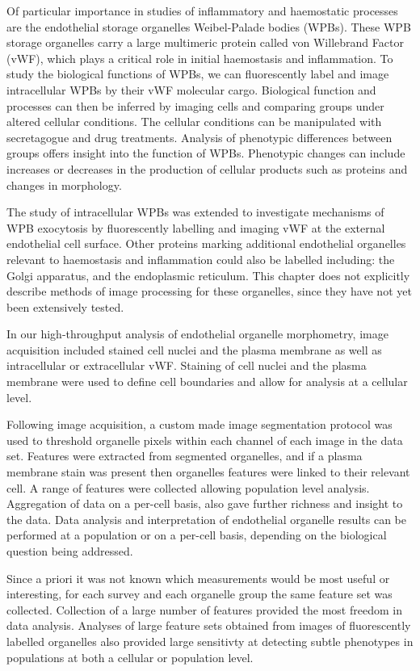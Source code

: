 Of particular importance in studies of inflammatory and haemostatic processes are the endothelial storage organelles Weibel-Palade bodies (WPBs). These WPB storage organelles carry a large multimeric protein called von Willebrand Factor (vWF), which plays a critical role in initial haemostasis and inflammation. To study the biological functions of WPBs, we can fluorescently label and image intracellular WPBs by their vWF molecular cargo. Biological function and processes can then be inferred by imaging cells and comparing groups under altered cellular conditions. The cellular conditions can be manipulated with secretagogue and drug treatments. Analysis of phenotypic differences between groups offers insight into the function of WPBs. Phenotypic changes can include increases or decreases in the production of cellular products such as proteins and changes in morphology.

The study of intracellular WPBs was extended to investigate mechanisms of WPB exocytosis by fluorescently labelling and imaging vWF at the external endothelial cell surface. Other proteins marking additional endothelial organelles relevant to haemostasis and inflammation could also be labelled including: the Golgi apparatus, and the endoplasmic reticulum. This chapter does not explicitly describe methods of image processing for these organelles, since they have not yet been extensively tested.

In our high-throughput analysis of endothelial organelle morphometry, image acquisition included stained cell nuclei and the plasma membrane as well as intracellular or extracellular vWF. Staining of cell nuclei and the plasma membrane were used to define cell boundaries and allow for analysis at a cellular level.

Following image acquisition, a custom made image segmentation protocol was used to threshold organelle pixels within each channel of each image in the data set. Features were extracted from segmented organelles, and if a plasma membrane stain was present then organelles features were linked to their relevant cell. A range of features were collected allowing population level analysis. Aggregation of data on a per-cell basis, also gave further richness and insight to the data. Data analysis and interpretation of endothelial organelle results can be performed at a population or on a per-cell basis, depending on the biological question being addressed.

Since a priori it was not known which measurements would be most useful or interesting, for each survey and each organelle group the same feature set was collected. Collection of a large number of features provided the most freedom in data analysis. Analyses of large feature sets obtained from images of fluorescently labelled organelles also provided large sensitivty at detecting subtle phenotypes in populations at both a cellular or population level.

